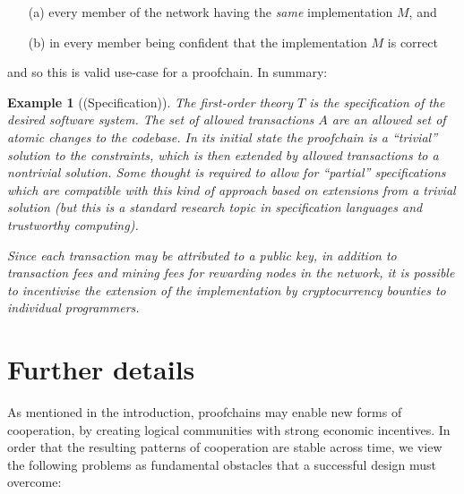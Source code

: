 \documentclass[english,letter paper,12pt,reqno]{article}
\theoremstyle{example}
\newtheorem{example}[theorem]{Example}
\begin{document}
\begin{itemize}
\item[(a)] every member of the network having the \emph{same} implementation $M$, and
\item[(b)] in every member being confident that the implementation $M$ is correct
\end{itemize}

and so this is valid use-case for a proofchain. In summary:

\begin{example}[(Specification)] The first-order theory $T$ is the specification of the desired software system. The set of allowed transactions $A$ are an allowed set of atomic changes to the codebase. In its initial state the proofchain is a ``trivial'' solution to the constraints, which is then extended by allowed transactions to a nontrivial solution. Some thought is required to allow for ``partial'' specifications which are compatible with this kind of approach based on extensions from a trivial solution (but this is a standard research topic in specification languages and trustworthy computing).

Since each transaction may be attributed to a public key, in addition to transaction fees and mining fees for rewarding nodes in the network, it is possible to incentivise the extension of the implementation by cryptocurrency bounties to individual programmers.
\end{example}

\section{Further details}\label{section:further_details}

As mentioned in the introduction, proofchains may enable new forms of cooperation, by creating logical communities with strong economic incentives. In order that the resulting patterns of cooperation are stable across time, we view the following problems as fundamental obstacles that a successful design must overcome:
\end{document}
